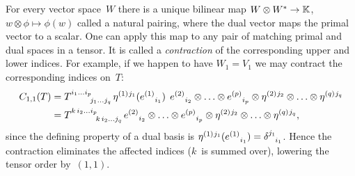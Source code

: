 For every vector space~$W$ there is a unique bilinear map
$W \otimes W^* \to {\mathbb K}$,
$w \otimes \phi \mapsto \phi(w)$
called a natural pairing,
where the dual vector maps the primal vector to a scalar.
One can apply this map to any pair of matching primal and dual spaces in a tensor.
It is called a \emph{contraction} of the corresponding upper and lower indices.
For example, if we happen to have $W_1 = V_1$ we may contract the corresponding indices on~$T$:
\begin{align}
\notag
C_{1,1}(T)
&=
T\indices{^{i_1 \ldots i_p}_{j_1 \ldots j_q}}
\eta\spidx{1}{j_1}{}(\bv\spidx{1}{}{i_1})
\:\:
\bv\spidx{2}{}{i_2} \otimes \ldots \otimes \bv\spidx{p}{}{i_p}
\otimes
\eta\spidx{2}{j_2}{} \otimes \ldots \otimes \eta\spidx{q}{j_q}{}\\
&=
T\indices{^{k \, i_2 \ldots i_p}_{k \, i_2 \ldots j_q}}
\bv\spidx{2}{}{i_2} \otimes \ldots \otimes \bv\spidx{p}{}{i_p}
\otimes
\eta\spidx{2}{j_2}{} \otimes \ldots \otimes \eta\spidx{q}{j_q}{},
\end{align}
since the defining property of a dual basis is
$\eta\spidx{1}{j_1}{}(\bv\spidx{1}{}{i_1}) = \delta\indices{^{j_1}_{i_1}}$.
Hence the contraction eliminates the affected indices ($k$~is summed over),
lowering the tensor order by~$(1,1)$.

